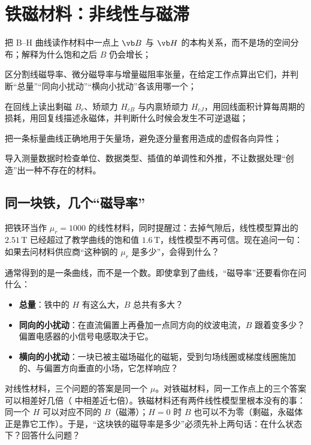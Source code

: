 \chapter{铁磁材料：非线性与磁滞}\label{ch:bh}

\begin{chapterguide}
\begin{guidegoals}
\item 把 B--H 曲线读作材料中一点上 $\vb B$ 与 $\vb H$ 的本构关系，而不是场的空间分布；解释为什么饱和之后 $B$ 仍会增长；
\item 区分割线磁导率、微分磁导率与增量磁阻率张量，在给定工作点算出它们，并判断“总量”“同向小扰动”“横向小扰动”各该用哪一个；
\item 在回线上读出剩磁 $B_r$、矫顽力 $H_{cB}$ 与内禀矫顽力 $H_{cJ}$，用回线面积计算每周期的损耗，用回复线描述永磁体，并判断什么时候会发生不可逆退磁；
\item 把一条标量曲线正确地用于矢量场，避免逐分量套用造成的虚假各向异性；
\item 导入测量数据时检查单位、数据类型、插值的单调性和外推，不让数据处理“创造”出一种不存在的材料。
\end{guidegoals}
\end{chapterguide}

\section{同一块铁，几个“磁导率”}\label{sec:bh-question}

 把铁环当作 $\mu_r=1000$ 的线性材料，同时提醒过：去掉气隙后，线性模型算出的 $2.51\,\mathrm T$ 已经超过了教学曲线的饱和值 $1.6\,\mathrm T$，线性模型不再可信。现在追问一句：如果去问材料供应商“这种钢的 $\mu_r$ 是多少”，会得到什么？

通常得到的是一条曲线，而不是一个数。即使拿到了曲线，“磁导率”还要看你在问什么：
\begin{itemize}
\item \textbf{总量}：铁中的 $H$ 有这么大，$B$ 总共有多大？
\item \textbf{同向的小扰动}：在直流偏置上再叠加一点同方向的纹波电流，$B$ 跟着变多少？偏置电感器的小信号电感取决于它。
\item \textbf{横向的小扰动}：一块已被主磁场磁化的磁轭，受到匀场线圈或梯度线圈施加的、与偏置方向垂直的小场，它怎样响应？
\end{itemize}
对线性材料，三个问题的答案是同一个 $\mu$。对铁磁材料，同一工作点上的三个答案可以相差好几倍（ 中相差近七倍）。铁磁材料还有两件线性模型里根本没有的事：同一个 $H$ 可以对应不同的 $B$（磁滞）；$H=0$ 时 $B$ 也可以不为零（剩磁，永磁体正是靠它工作）。于是，“这块铁的磁导率是多少”必须先补上两句话：在什么状态下？回答什么问题？

